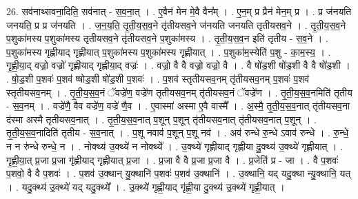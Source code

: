\documentclass[17pt]{extarticle}
\begin{document}
26. सव॑नाथ्सवना॒दिति॒ सव॑नात् - स॒व॒ना॒त् । . ए॒वैन॑ मेन मे॒वै वैन᳚म् । . ए॒न॒म् प्र प्रैन॑ मेन॒म् प्र । . प्र ज॑नयति जनयति॒ प्र प्र ज॑नयति । . ज॒न॒य॒ति॒ तृ॒ती॒य॒स॒व॒ने तृ॑तीयसव॒ने ज॑नयति जनयति तृतीयसव॒ने । . तृ॒ती॒य॒स॒व॒ने प॒शुका॑मस्य प॒शुका॑मस्य तृतीयसव॒ने तृ॑तीयसव॒ने प॒शुका॑मस्य । . तृ॒ती॒य॒स॒व॒न इति॑ तृतीय - स॒व॒ने । . प॒शुका॑मस्य गृह्णीयाद् गृह्णीयात् प॒शुका॑मस्य प॒शुका॑मस्य गृह्णीयात् । . प॒शुका॑म॒स्येति॑ प॒शु - का॒म॒स्य॒ । . गृ॒ह्णी॒या॒द् वज्रो॒ वज्रो॑ गृह्णीयाद् गृह्णीया॒द् वज्रः॑ । . वज्रो॒ वै वै वज्रो॒ वज्रो॒ वै । . वै षो॑ड॒शी षो॑ड॒शी वै वै षो॑ड॒शी । . षो॒ड॒शी प॒शवः॑ प॒शव॑ ष्षोड॒शी षो॑ड॒शी प॒शवः॑ । . प॒शव॑ स्तृतीयसव॒नम् तृ॑तीयसव॒नम् प॒शवः॑ प॒शव॑ स्तृतीयसव॒नम् । . तृ॒ती॒य॒स॒व॒नं ॅवज्रे॑ण॒ वज्रे॑ण तृतीयसव॒नम् तृ॑तीयसव॒नं ॅवज्रे॑ण । . तृ॒ती॒य॒स॒व॒नमिति॑ तृतीय - स॒व॒नम् । . वज्रे॑णै॒ वैव वज्रे॑ण॒ वज्रे॑ णै॒व । . ए॒वास्मा॑ अस्मा ए॒वै वास्मै᳚ । . अ॒स्मै॒ तृ॒ती॒य॒स॒व॒नात् तृ॑तीयसव॒ना द॑स्मा अस्मै तृतीयसव॒नात् । . तृ॒ती॒य॒स॒व॒नात् प॒शून् प॒शून् तृ॑तीयसव॒नात् तृ॑तीयसव॒नात् प॒शून् । . तृ॒ती॒य॒स॒व॒नादिति॑ तृतीय - स॒व॒नात् । . प॒शू नवाव॑ प॒शून् प॒शू नव॑ । . अव॑ रुन्धे रु॒न्धे ऽवाव॑ रुन्धे । . रु॒न्धे॒ न न रु॑न्धे रुन्धे॒ न । . नोक्थ्य॑ उ॒क्थ्ये॑ न नोक्थ्ये᳚ । . उ॒क्थ्ये॑ गृह्णीयाद् गृह्णीया दु॒क्थ्य॑ उ॒क्थ्ये॑ गृह्णीयात् । . गृ॒ह्णी॒या॒त् प्र॒जा प्र॒जा गृ॑ह्णीयाद् गृह्णीयात् प्र॒जा । . प्र॒जा वै वै प्र॒जा प्र॒जा वै । . प्र॒जेति॑ प्र - जा । . वै प॒शवः॑ प॒शवो॒ वै वै प॒शवः॑ । . प॒शव॑ उ॒क्थान् यु॒क्थानि॑ प॒शवः॑ प॒शव॑ उ॒क्थानि॑ । . उ॒क्थानि॒ यद् यदु॒क्था न्यु॒क्थानि॒ यत् । . यदु॒क्थ्य॑ उ॒क्थ्ये॑ यद् यदु॒क्थ्ये᳚ । . उ॒क्थ्ये॑ गृह्णी॒याद् गृ॑ह्णी॒या दु॒क्थ्य॑ उ॒क्थ्ये॑ गृह्णी॒यात् । \newline
\end{document}
